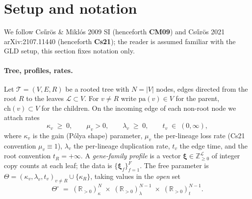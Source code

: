 \documentclass[11pt]{article}
\newcommand{\R}{\mathbb{R}}
\newcommand{\Z}{\mathbb{Z}}
\newcommand{\Tree}{\mathcal{T}}
\newcommand{\Leaves}{\mathcal{L}}
\newcommand{\pa}{\mathrm{pa}}
\newcommand{\ch}{\mathrm{ch}}
\newcommand{\troot}{R}
\newcommand{\Prof}{\boldsymbol{\xi}}
\newcommand{\rate}{\kappa}             %
\newcommand{\dup}{\lambda}             %
\newcommand{\loss}{\mu}                %
\newcommand{\edgelen}{t}               %
\theoremstyle{definition}
\begin{document}
\section{Setup and notation}
\label{sec:notation}

We follow Cs\H{u}r\"os \& Mikl\'os 2009 SI (henceforth \textbf{CM09})
and Cs\H{u}r\"os 2021 arXiv:2107.11440 (henceforth \textbf{Cs21}); the
reader is assumed familiar with the GLD setup, this section fixes
notation only.

\paragraph{Tree, profiles, rates.}
Let $\Tree = (V, E, \troot)$ be a rooted tree with $N=|V|$ nodes,
edges directed from the root $\troot$ to the leaves
$\Leaves \subset V$. For $v \neq \troot$ write $\pa(v)\in V$ for the
parent, $\ch(v) \subset V$ for the children. On the incoming edge of
each non-root node we attach rates
\begin{equation}
\rate_v \;\ge\; 0, \qquad
\loss_v > 0, \qquad
\dup_v \;\ge\; 0, \qquad
\edgelen_v \;\in\; (0, \infty),
\label{eq:rates}
\end{equation}
where $\rate_v$ is the gain (Pólya shape) parameter, $\loss_v$ the
per-lineage loss rate (Cs21 convention $\loss_v \equiv 1$),
$\dup_v$ the per-lineage duplication rate, $\edgelen_v$ the edge
time, and the root convention $\edgelen_\troot = +\infty$. A
\emph{gene-family profile} is a vector
$\Prof \in \Z_{\ge 0}^\Leaves$ of integer copy counts at each leaf;
the data is $\{\Prof_f\}_{f=1}^F$. The free parameter is
$\Theta = (\rate_v, \dup_v, \edgelen_v)_{v\ne \troot} \cup
\{\rate_\troot\}$, taking values in the \emph{open} set
\begin{equation}
\Theta^\circ
\;=\;
(\R_{>0})^N_\rate \;\times\; (\R_{>0})^{N-1}_\dup \;\times\;
(\R_{>0})^{N-1}_\edgelen.
\label{eq:openparam}
\end{equation}
\end{document}

